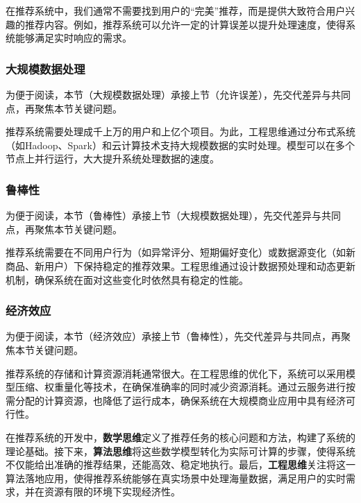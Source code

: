 在推荐系统中，我们通常不需要找到用户的“完美”推荐，而是提供大致符合用户兴趣的推荐内容。例如，推荐系统可以允许一定的计算误差以提升处理速度，使得系统能够满足实时响应的需求。
\subsubsection*{大规模数据处理}


为便于阅读，本节（大规模数据处理）承接上节（允许误差），先交代差异与共同点，再聚焦本节关键问题。

推荐系统需要处理成千上万的用户和上亿个项目。为此，工程思维通过分布式系统（如Hadoop、Spark）和云计算技术支持大规模数据的实时处理。模型可以在多个节点上并行运行，大大提升系统处理数据的速度。
\subsubsection*{鲁棒性}


为便于阅读，本节（鲁棒性）承接上节（大规模数据处理），先交代差异与共同点，再聚焦本节关键问题。

推荐系统需要在不同用户行为（如异常评分、短期偏好变化）或数据源变化（如新商品、新用户）下保持稳定的推荐效果。工程思维通过设计数据预处理和动态更新机制，确保系统在面对这些变化时依然具有稳定的性能。
\subsubsection*{经济效应}


为便于阅读，本节（经济效应）承接上节（鲁棒性），先交代差异与共同点，再聚焦本节关键问题。

推荐系统的存储和计算资源消耗通常很大。在工程思维的优化下，系统可以采用模型压缩、权重量化等技术，在确保准确率的同时减少资源消耗。通过云服务进行按需分配的计算资源，也降低了运行成本，确保系统在大规模商业应用中具有经济可行性。

在推荐系统的开发中，{\bf 数学思维}定义了推荐任务的核心问题和方法，构建了系统的理论基础。接下来，{\bf 算法思维}将这些数学模型转化为实际可计算的步骤，使得系统不仅能给出准确的推荐结果，还能高效、稳定地执行。最后，{\bf 工程思维}关注将这一算法落地应用，使得推荐系统能够在真实场景中处理海量数据，满足用户的实时需求，并在资源有限的环境下实现经济性。
